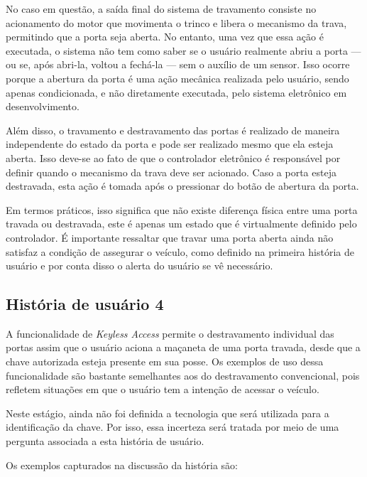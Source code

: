 No caso em questão, a saída final do sistema de travamento consiste no acionamento do motor que movimenta o trinco e libera o mecanismo da trava, permitindo 
que a porta seja aberta. No entanto, uma vez que essa ação é executada, o sistema não tem como saber se o usuário realmente abriu a porta — ou se, após abri-la, 
voltou a fechá-la — sem o auxílio de um sensor. Isso ocorre porque a abertura da porta é uma ação mecânica realizada pelo usuário, sendo apenas condicionada, e 
não diretamente executada, pelo sistema eletrônico em desenvolvimento.

Além disso, o travamento e destravamento das portas é realizado de maneira independente do estado da porta e pode ser realizado mesmo que ela esteja aberta. Isso 
deve-se ao fato de que o controlador eletrônico é responsável por definir quando o mecanismo da trava deve ser acionado. Caso a porta esteja destravada, esta ação 
é tomada após o pressionar do botão de abertura da porta.

Em termos práticos, isso significa que não existe diferença física entre uma porta travada ou destravada, este é apenas um estado que é virtualmente definido 
pelo controlador. É importante ressaltar que travar uma porta aberta ainda não satisfaz a condição de assegurar o veículo, como definido na primeira história 
de usuário e por conta disso o alerta do usuário se vê necessário.

\subsection{História de usuário 4}

A funcionalidade de \textit{Keyless Access} permite o destravamento individual das portas assim que o usuário aciona a maçaneta de uma porta travada, desde que a chave 
autorizada esteja presente em sua posse. Os exemplos de uso dessa funcionalidade são bastante semelhantes aos do destravamento convencional, pois refletem 
situações em que o usuário tem a intenção de acessar o veículo. 

Neste estágio, ainda não foi definida a tecnologia que será utilizada para a identificação da chave. Por isso, essa incerteza será tratada por meio de uma 
pergunta associada a esta história de usuário.

Os exemplos capturados na discussão da história são:

